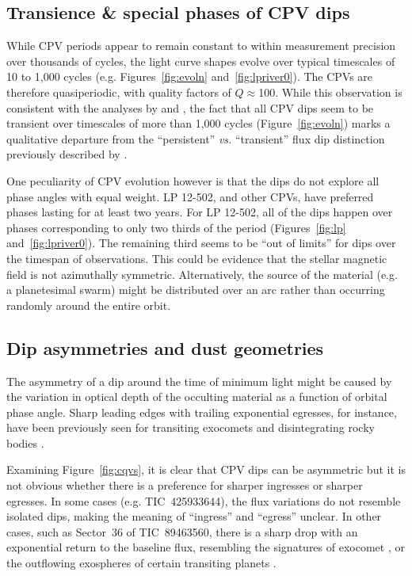 \documentclass[11pt,twocolumn,tighten]{aastex63}
\begin{document}
\subsection{Transience \& special phases of CPV dips}

While CPV periods appear to remain constant to within measurement
precision over thousands of cycles, the light curve shapes evolve over
typical timescales of 10 to 1{,}000 cycles (e.g.
Figures~\ref{fig:evoln} and~\ref{fig:lpriver0}).  The CPVs are
therefore quasiperiodic, with quality factors of $Q$$\approx$100.
While this observation is consistent with the analyses by
\citet{2022AJ....163..144G} and \citet{2023ApJ...945..114P}, the fact
that all CPV dips seem to be transient over timescales of more than
1{,}000 cycles (Figure~\ref{fig:evoln}) marks a qualitative departure
from the ``persistent'' {\it vs.} ``transient'' flux dip distinction
previously described by \citet{2017AJ....153..152S}.

One peculiarity of CPV evolution however is that the dips do not
explore all phase angles with equal weight.  LP 12-502, and other CPVs,
have preferred phases lasting for at least two years.  For LP 12-502,
all of the dips happen over phases corresponding to only two thirds of
the period (Figures~\ref{fig:lp} and~\ref{fig:lpriver0}).  The
remaining third seems to be ``out of limits'' for dips over the
timespan of observations.  This could be evidence that the stellar
magnetic field is not azimuthally symmetric.  Alternatively, the
source of the material (e.g. a planetesimal swarm) might be
distributed over an arc rather than occurring randomly around the
entire orbit.  



\subsection{Dip asymmetries and dust geometries}

The asymmetry of a dip around the time of minimum light might be
caused by the variation in optical depth of the occulting material as
a function of orbital phase angle.  Sharp leading edges with trailing
exponential egresses, for instance, have been previously seen for
transiting exocomets and disintegrating rocky bodies
\citep[e.g.][]{2012ApJ...752....1R,2012A&A...545L...5B,2015Natur.526..546V,2019A&A...625L..13Z}.

Examining Figure~\ref{fig:cqvs}, it is clear that CPV dips can be
asymmetric but it is not obvious whether there is a preference for
sharper ingresses or sharper egresses.  In some cases (e.g.
TIC~425933644), the flux variations do not resemble isolated dips,
making the meaning of ``ingress'' and ``egress'' unclear.  In other
cases, such as Sector~36 of TIC~89463560, there is a sharp drop with
an exponential return to the baseline flux, resembling the signatures
of exocomet \citep[e.g.][]{2018MNRAS.474.1453R,2019A&A...625L..13Z},
or the outflowing exospheres of certain transiting planets
\citep[e.g.][]{2019ApJ...873...89M,2022ApJ...926..226M}.
\end{document}
